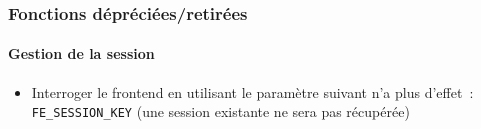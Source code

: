 %

\begin{frame}[fragile]
	\frametitle{Fonctions dépréciées/retirées}
	\framesubtitle{Gestion de la session}

	\begin{itemize}

		\item Interroger le frontend en utilisant le paramètre suivant n'a
			plus d'effet~: \small\texttt{FE\_SESSION\_KEY}\normalsize\newline
			\small(une session existante ne sera pas récupérée)\normalsize

	\end{itemize}

\end{frame}


